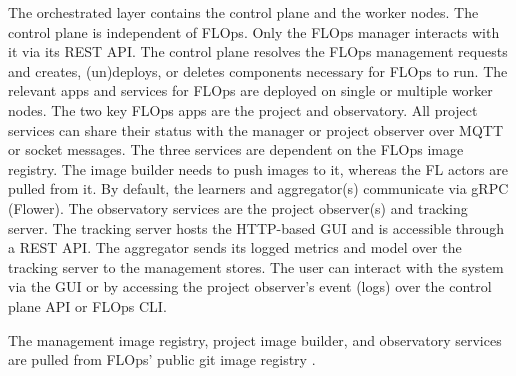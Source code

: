 The orchestrated layer contains the control plane and the worker nodes.
The control plane is independent of FLOps.
Only the FLOps manager interacts with it via its REST API.
The control plane resolves the FLOps management requests and creates, (un)deploys, or deletes components necessary for FLOps to run.
The relevant apps and services for FLOps are deployed on single or multiple worker nodes.
The two key FLOps apps are the project and observatory.
All project services can share their status with the manager or project observer over MQTT or socket messages.
The three services are dependent on the FLOps image registry.
The image builder needs to push images to it, whereas the FL actors are pulled from it.
By default, the learners and aggregator(s) communicate via gRPC (Flower).
The observatory services are the project observer(s) and tracking server.
The tracking server hosts the HTTP-based GUI and is accessible through a REST API.
The aggregator sends its logged metrics and model over the tracking server to the management stores.
The user can interact with the system via the GUI or by accessing the project observer's event (logs) over the control plane API or FLOps CLI.

The management image registry, project image builder, and observatory services are pulled from FLOps' public git image registry \cite{flops_code}.